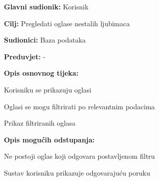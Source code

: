 					\noindent {}
					\begin{packed_item}
	
						\item \textbf{Glavni sudionik:} Korisnik
						\item  \textbf{Cilj:} Pregledati oglase nestalih ljubimaca
						\item  \textbf{Sudionici:} Baza podataka
						\item  \textbf{Preduvjet:} -
						\item  \textbf{Opis osnovnog tijeka:}
						
						\item[] \begin{packed_enum}
	
							\item Korisniku se prikazuju oglasi
							\item Oglasi se mogu filtrirati po relevantnim podacima
							\item Prikaz filtriranih oglasa
						\end{packed_enum}
						
						\item  \textbf{Opis mogućih odstupanja:}
						
						\item[] \begin{packed_item}
	
							\item[2.a] Ne postoji oglas koji odgovara postavljenom filtru
							\item[] \begin{packed_enum}
								
								\item Sustav korisniku prikazuje odgovarajuću poruku
								
							\end{packed_enum}
							
						\end{packed_item}
					\end{packed_item}
					
